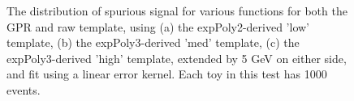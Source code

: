 \begin{figure} 
\begin{center}

\caption{The distribution of spurious signal for various functions for both the GPR and raw template, using (a) the expPoly2-derived 'low' template, (b) the expPoly3-derived 'med' template, (c) the expPoly3-derived 'high' template, extended by 5 GeV on either side, and fit using a linear error kernel. Each toy in this test has 1000 events.}
\label{fig:linearkernel_lowpt_1000_noSig}
\end{center}
\end{figure}

